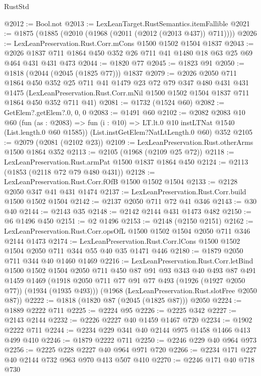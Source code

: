 \begin{lexlean}{RustStd}
\begin{coremodule}
@2012 := Bool.not
@2013 := LexLeanTarget.RustSemantics.itemFallible
@2021 := @1875 (@1885 (@2010 (@1968 (@2011 (@2012 (@2013 @437)) @711))))
@2026 := LexLeanPreservation.Rust.Corr.mCons @1500 @1502 @1504 @1837
@2043 := @2026 @1837 @711 @1864 @450 @352 @26 @711 @41 @1480 @18 @63 @25 @69 @464 @431 @431 @473
@2044 := @1820 @77
@2045 := @1823 @91
@2050 := @1818 (@2044 (@2045 (@1825 @77))) @1837
@2079 := @2026
    @2050
    @711
    @1864
    @450
    @352
    @25
    @711
    @41
    @1479
    @23
    @72
    @79
    @347
    @480
    @431
    @431
    @1475
    (LexLeanPreservation.Rust.Corr.mNil @1500 @1502 @1504 @1837 @711 @1864 @450 @352 @711 @41)
@2081 := @1732 (@1524 @60)
@2082 := GetElem?.getElem?.{0, 0, 0}
@2083 := @1491 @60
@2102 := @2082
    @2083
    @10
    @60
    (fun (as : @2083) => fun (i : @10) => LT.lt.{0} @10 instLTNat @1540 (List.length.{0} @60 @1585))
    (List.instGetElem?NatLtLength.{0} @60)
    @352
@2105 := @2079 (@2081 (@2102 @23))
@2109 := LexLeanPreservation.Rust.otherArms @1500 @1864 @352
@2113 := @2105 (@1968 (@2109 @25 @72))
@2118 := LexLeanPreservation.Rust.armPat @1500 @1837 @1864 @450
@2124 := @2113 (@1853 (@2118 @72 @79 @480 @431))
@2128 := LexLeanPreservation.Rust.Corr.fOfB @1500 @1502 @1504
@2133 := @2128 @2050 @347 @41 @431 @1474
@2137 := LexLeanPreservation.Rust.Corr.build @1500 @1502 @1504
@2142 := @2137 @2050 @711 @72 @41 @346
@2143 := @30 @40
@2144 := @2143 @35
@2148 := @2142 @2144 @431 @1473 @482
@2150 := @6 @1496 @450
@2151 := @2 @1496
@2153 := @2148 (@2150 @2151)
@2162 := LexLeanPreservation.Rust.Corr.opsOfL @1500 @1502 @1504 @2050 @711 @346 @2144 @1473
@2174 := LexLeanPreservation.Rust.Corr.lCons
    @1500
    @1502
    @1504
    @2050
    @711
    @344
    @55
    @40
    @35
    @1471
    @446
@2180 := @1879 @2050 @711 @344 @40 @1460 @1469
@2216 := LexLeanPreservation.Rust.Corr.letBind
    @1500
    @1502
    @1504
    @2050
    @711
    @450
    @87
    @91
    @93
    @343
    @40
    @493
    @87
    @491
    @1459
    @1469
    (@1918 @2050 @711 @77 @91 @77 @493 (@1926 (@1927 @2050 @77)) (@1934 (@1935 @493)))
    (@1968 (LexLeanPreservation.Rust.slotFree @2050 @87))
@2222 := @1818 (@1820 @87 (@2045 (@1825 @87))) @2050
@2224 := @1889 @2222 @711
@2225 := @2224 @95
@2226 := @2225 @342
@2227 := @2143 @2144
@2232 := @2226 @2227 @40 @1459 @1467 @720
@2234 := @1902 @2222 @711
@2244 := @2234 @229 @341 @40 @2144 @975 @1458 @1466 @413 @499 @410
@2246 := @1879 @2222 @711
@2250 := @2246 @229 @40 @964 @973
@2256 := @2225 @228 @2227 @40 @964 @971 @720
@2266 := @2234 @171 @227 @40 @2144 @732 @963 @970 @413 @507 @410
@2270 := @2246 @171 @40 @718 @730

\end{coremodule}
\end{lexlean}
